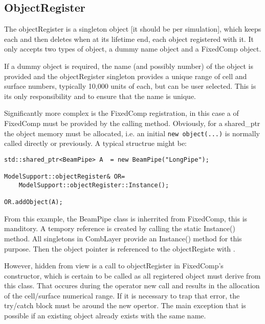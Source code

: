 \subsection{ObjectRegister}
\label{ObjectRegister}

The objectRegister is a singleton object [it should be per
  simulation], which keeps each and then deletes when at its lifetime
end, each object registered with it. It only accepts two types of
object, a dummy name object and a FixedComp object. 

If a dummy object is required, the name (and possibly number) of the object 
is provided and the objectRegister singleton provides a unique
range of cell and surface numbers, typically 10,000 units of each, but
can be user selected. This is its only responsibility and to ensure that the
name is unique. 

Significantly more complex is the FixedComp registration, in this case
a  of FixedComp must be provided by the
calling method. Obviously, for a shared\_ptr the object memory must be
allocated, i.e. an initial \verb|new object(...)| is normally called
directly or previously. A typical structrue might be:

\begin{verbatim}
std::shared_ptr<BeamPipe> A  = new BeamPipe("LongPipe");

ModelSupport::objectRegister& OR=
    ModelSupport::objectRegister::Instance();

OR.addObject(A);
\end{verbatim}

From this example, the BeamPipe class is inherrited from FixedComp,
this is manditory. A tempory reference  is created by calling
the static Instance() method. All singletons in CombLayer provide an
Instance() method for this purpose. Then the object pointer is referenced
to the objectRegiste with .

However, hidden from view is a call to objectRegister in FixedComp's
constructor, which is certain to be called as all registered object must derive
from this class. That occures during the operator new call and results
in the allocation of the cell/surface numerical range. If it is
necessary to trap that error, the try/catch block must be around the
new opertor. The main exception that is possible if an existing object
already exists with the same name.


